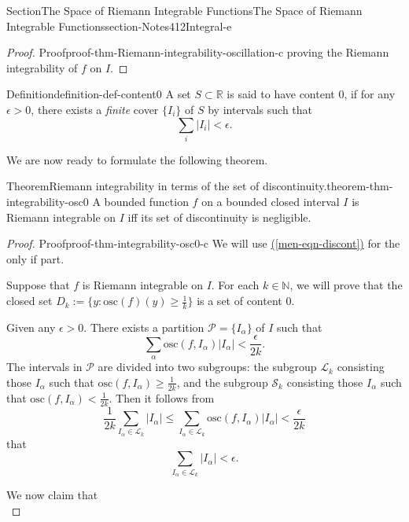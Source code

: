 \documentclass[oneside,10pt,]{article}
\newcommand{\xreffont}{\relax}
\numberwithin{equation}{section}
\newcommand{\bbR}{\mathbb{R}}
\newcommand{\bbN}{\mathbb{N}}
\newcommand{\cL}{\mathcal{L}}
\newcommand{\cP}{\mathcal{P}}
\newcommand{\cS}{\mathcal{S}}
\newcommand{\osc}{\text{osc}}
\begin{document}
\begin{sectionptx}{Section}{The Space of Riemann Integrable Functions}{}{The Space of Riemann Integrable Functions}{}{}{section-Notes412Integral-e}
\begin{proof}{Proof}{}{proof-thm-Riemann-integrability-oscillation-c}
proving the Riemann integrability of \(f\) on \(I\).%
\end{proof}
\begin{definition}{Definition}{}{definition-def-content0}%
%
A set \(S\subset \bbR\) is said to have content \(0\), if for any \(\epsilon >0\), there exists a \emph{finite} cover \(\{I_{i}\} \) of \(S\) by intervals such that%
\begin{equation*}
\sum_{i}\vert I_{i}\vert < \epsilon.
\end{equation*}
%
\end{definition}
We are now ready to formulate the following theorem.%
\begin{theorem}{Theorem}{Riemann integrability in terms of the set of discontinuity.}{}{theorem-thm-integrability-osc0}%
A bounded function \(f\) on a bounded closed interval \(I\) is Riemann integrable on \(I\) iff its set of discontinuity is negligible.%
\end{theorem}
\begin{proof}{Proof}{}{proof-thm-integrability-osc0-c}
We will use \hyperref[men-eqn-discont]{({\xreffont\ref{men-eqn-discont}})} for the only if part.%
\par
Suppose that \(f\) is Riemann integrable on \(I\). For each \(k\in \bbN\), we will prove that the closed set \(D_{k}:=\{y: \osc(f)(y)\ge \frac 1k\}\) is a set of content \(0\).%
\par
Given any \(\epsilon >0\). There exists a partition \(\cP=\{I_{\alpha}\}\) of \(I\) such that%
\begin{equation*}
\sum_{\alpha} \osc(f, I_{\alpha})\vert I_{\alpha} \vert < \frac{\epsilon}{2k}.
\end{equation*}
The intervals in \(\cP\) are divided into two subgroups: the subgroup \(\cL_{k}\) consisting those \(I_{\alpha}\) such that \(\osc(f, I_{\alpha})\ge \frac{1}{2k}\), and the subgroup \(\cS_{k}\) consisting those \(I_{\alpha}\) such that \(\osc(f, I_{\alpha})< \frac{1}{2k}\). Then it follows from%
\begin{equation*}
\frac{1}{2k} \sum_{I_{\alpha}\in \cL_{k} } \vert I_{\alpha} \vert \le
\sum_{I_{\alpha}\in \cL_{k} } \osc(f, I_{\alpha})\vert I_{\alpha} \vert < \frac{\epsilon}{2k}
\end{equation*}
that%
\begin{equation*}
\sum_{I_{\alpha}\in \cL_{k} } \vert I_{\alpha} \vert < \epsilon.
\end{equation*}
%
\par
We now claim that%
\begin{equation*}

\end{equation*}
\end{proof}
\end{sectionptx}
\end{document}
